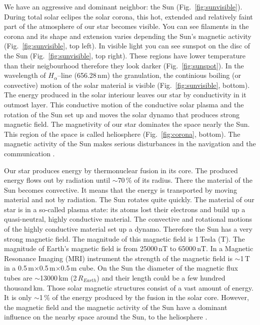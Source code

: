 \documentclass[sn-aps]{sn-jnl}%
\begin{document}
We have an aggressive and dominant neighbor: the Sun (Fig.~\ref{fig:sunvisible}). During total solar eclipes the solar corona, this hot, extended and relatively faint part of the atmosphere of our star becomes visible. You can see filaments in the corona and its shape and extension varies depending the Sun's magnetic activity (Fig.~\ref{fig:sunvisible}, top left). In visible light you can see sunspot on the disc of the Sun (Fig.~\ref{fig:sunvisible}, top right). These regions have lower temperature than their neigbourhood therefore they look darker (Fig.~\ref{fig:sunspot}). In the wavelength of $H_{\alpha}$--line (656.28\,nm) the granulation, the continious boiling (or convective) motion of the solar material is visible (Fig.~\ref{fig:sunvisible}, bottom). The energy produced in the solar interiour leaves our star by conductivity in it outmost layer. This conductive motion of the conductive solar plasma and the rotation of the Sun set up and moves the solar dynamo that produces strong magnetic field. The magnetivity of our star dominates the space nearly the Sun. This region of the space is called heliosphere (Fig.~\ref{fig:corona}, bottom). The magnetic activity of the Sun makes serious disturbances in the navigation and the communication \cite{scherer05:_space_weath,stix04:_sun_introd}. 

Our star produces energy by thermonuclear fusion in its core. The produced energy flows out by radiation until $\sim$70\,\% of its radius. There the material of the Sun becomes convective. It means that the energy is transported by moving material and not by radiation. The Sun rotates quite quickly. The material of our star is in a so-called plasma state: its atoms lost their electrons and build up a quasi-neutral, highly conductive material. The convective and rotational motions of the highly conductive material set up a dynamo. Therefore the Sun has a very strong magnetic field. The magnitude of this magnetic field is 1\,Tesla (T). The magnitude of Earth's magnetic field is from 25000\,nT to 65000\,nT. In a Magnetic Resonance Imaging (MRI) instrument the strength of the magnetic field is $\sim$1\,T in a 0.5\,m$\times$0.5\,m$\times$0.5\,m cube. On the Sun the diameter of the magnetic flux tubes are $\sim$13000\,km (2\,$R_{Earth}$) and their length could be a few hundred thousand\,km. Those solar magnetic structures consist of a vast amount of energy. It is only $\sim$1\,\% of the energy produced by the fusion in the solar core. However, the magnetic field and the magnetic activity of the Sun have a dominant influence on the nearby space around the Sun, to the heliosphere \cite{scherer05:_space_weath,stix04:_sun_introd}.
\end{document}
